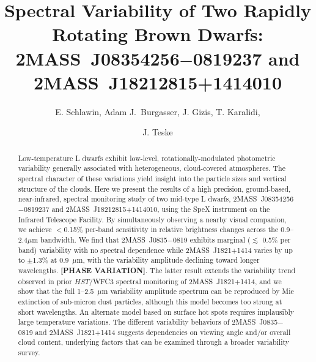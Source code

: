 \documentclass[twocolumn]{aastex6}
\begin{document}
\title{Spectral Variability of Two Rapidly Rotating Brown Dwarfs: \\2MASS~J08354256$-$0819237 and 2MASS~J18212815+1414010}


\author{E. Schlawin, Adam J.\ Burgasser, J. Gizis, T. Karalidi, \and J. Teske}


\begin{abstract}
Low-temperature L dwarfs exhibit low-level, rotationally-modulated photometric variability generally associated with heterogeneous, cloud-covered atmospheres. The spectral character of these variations yield insight into the particle sizes and vertical structure of the clouds. Here we present the results of a high precision, ground-based, near-infrared, spectral monitoring study of two mid-type L dwarfs, 2MASS~J08354256$-$0819237 and 2MASS~J18212815+1414010, using the SpeX instrument on the Infrared Telescope Facility. By simultaneously observing a nearby visual companion, we achieve $<$0.15\% per-band sensitivity in relative brightness changes across the 0.9--2.4$\mu$m bandwidth. We find that 2MASS~J0835$-$0819 exhibits marginal ($\lesssim$ 0.5\% per band) variability with no spectral dependence while 2MASS~J1821+1414 varies by up to $\pm$1.3\% at 0.9~$\mu$m, with the variability amplitude declining toward longer wavelengths.  {\bf [PHASE VARIATION]}. The latter result extends the variability trend observed in prior $HST$/WFC3 spectral monitoring of 2MASS~J1821+1414, and we show that the full 1--2.5~$\mu$m variability amplitude spectrum can be reproduced by Mie extinction of sub-micron dust particles, although this model becomes too strong at short wavelengths. An alternate model based on surface hot spots requires implausibly large temperature variations. The different variability behaviors of 2MASS~J0835$-$0819 and  2MASS~J1821+1414 suggests dependencies on viewing angle and/or overall cloud content, underlying factors that can be examined through a broader variability survey.
\end{abstract}
\end{document}
